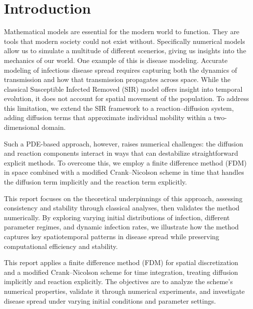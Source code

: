 \section{Introduction}
Mathematical models are essential for the modern world to function. They are tools that modern society could not 
exist without. Specifically numerical models allow us to simulate a multitude of different scenerios, giving us 
insights into the mechanics of our world. One example of this is disease modeling. Accurate modeling of infectious disease spread requires capturing both the dynamics of transmission and how that
transmission propagates across space. While the classical Susceptible Infected Removed (SIR) model offers 
insight into temporal evolution, it does not account for spatial movement of the population. To address 
this limitation, we extend the SIR framework to a reaction--diffusion system, adding diffusion terms that 
approximate individual mobility within a two-dimensional domain. 

Such a PDE-based approach, however, raises numerical challenges: the diffusion and reaction components 
interact in ways that can destabilize straightforward explicit methods. To overcome this, 
we employ a finite difference method (FDM) in space combined with a modified Crank--Nicolson scheme in 
time that handles the diffusion term implicitly and the reaction term explicitly. 

This report focuses on the theoretical underpinnings of this approach, assessing consistency and stability 
through classical analyses, then validates the method numerically. By exploring varying initial distributions 
of infection, different parameter regimes, and dynamic infection rates, we illustrate how the method captures 
key spatiotemporal patterns in disease spread while preserving computational efficiency and stability.

This report applies a finite difference method (FDM) for spatial discretization and a modified Crank--Nicolson 
scheme for time integration, treating diffusion implicitly and reaction explicitly. The objectives are to 
analyze the scheme's numerical properties, validate it through numerical experiments, and investigate disease 
spread under varying initial conditions and parameter settings.
